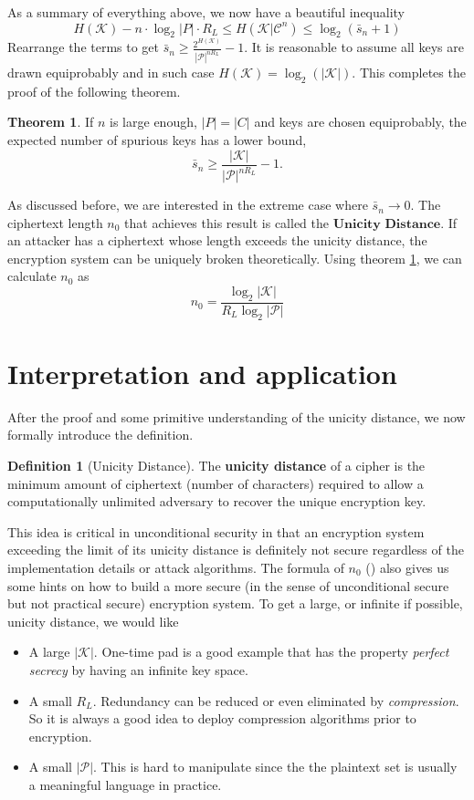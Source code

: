 \documentclass[letterpaper, 10 pt, conference]{ieeeconf}  %
\theoremstyle{definition}
\newtheorem{definition}{Definition}[section]
\theoremstyle{property}
\newtheorem{theorem}{Theorem}
\begin{document}
As a summary of everything above, we now have a beautiful inequality
$$
H(\mathcal{K}) - n\cdot \log_2|P|\cdot  R_L \leq H(\mathcal{K}\vert \mathcal{C}^n) \leq \log_2 (\bar s_n + 1)
$$
Rearrange the terms to get $\bar s_n\geq \frac{2^{H(\mathcal{K})}}{|\mathcal{P}|^{n R_L}}-1$. It is reasonable to assume all keys are drawn equiprobably and in such case $H(\mathcal{K})=\log_2 (|\mathcal{K}|)$. This completes the proof of the following theorem.
\begin{theorem}
\label{unicity}
If $n$ is large enough, $|P|=|C|$ and keys are chosen equiprobably, the expected number of spurious keys has a lower bound,
$$
\bar s_n \geq \frac{|\mathcal{K}|}{|\mathcal{P}|^{n R_L}}-1.
$$
\end{theorem}

As discussed before, we are interested in the extreme case where $\bar s_n\to 0$. The ciphertext length $n_0$ that achieves this result is called the $\textbf{Unicity Distance}$. If an attacker has a ciphertext whose length exceeds the unicity distance, the encryption system can be uniquely broken theoretically. Using theorem \ref{unicity}, we can calculate $n_0$ as
\[
n_0=\frac{\log_2|\mathcal{K}|}{R_L \log_2|\mathcal{P}|} \tag*{\AsteriskThinCenterOpen}
\]


\section{Interpretation and application}
After the proof and some primitive understanding of the unicity distance, we now formally introduce the definition.
\begin{definition}[Unicity Distance]
\label{def:uni-dis}
The \textbf{unicity distance} of a cipher is the minimum amount of ciphertext (number of characters) required to allow a computationally unlimited adversary to recover the unique encryption key.
\end{definition}
This idea is critical in unconditional security in that an encryption system exceeding the limit of its unicity distance is definitely not secure regardless of the implementation details or attack algorithms. The formula of $n_0$ (\AsteriskThinCenterOpen) also gives us some hints on how to build a more secure (in the sense of unconditional secure but not practical secure) encryption system. To get a large, or infinite if possible, unicity distance, we would like
\begin{itemize}
    \item A large $|\mathcal{K}|$. One-time pad is a good example that has the property \textit{perfect secrecy} by having an infinite key space.
    \item A small $R_L$. Redundancy can be reduced or even eliminated by \textit{compression}\cite{shannon1949communication}. So it is always a good idea to deploy compression algorithms prior to encryption.
    \item A small $|\mathcal{P}|$. This is hard to manipulate since the the plaintext set is usually a meaningful language in practice.
\end{itemize}
\end{document}
